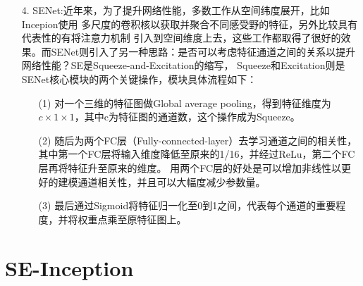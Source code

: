 \begin{itemize}

\item [4.]SENet:近年来，为了提升网络性能，多数工作从空间纬度展开，比如Incepion使用
多尺度的卷积核以获取并聚合不同感受野的特征，另外比较具有代表性的有将注意力机制
引入到空间维度上去，这些工作都取得了很好的效果。而SENet则引入了另一种思路：是否可以考虑特征通道之间的关系以提升网络性能？SE是Squeeze-and-Excitation的缩写，
Squeeze和Excitation则是SENet核心模块的两个关键操作，模块具体流程如下：
\begin{itemize}
  \item [(1)] 对一个三维的特征图做Global average pooling，得到特征维度为${c\times1\times1}$，其中c为特征图的通道数，这个操作成为Squeeze。
  \item [(2)] 随后为两个FC层（Fully-connected-layer）去学习通道之间的相关性，其中第一个FC层将输入维度降低至原来的1/16，并经过ReLu，第二个FC层再将特征升至原来的维度。
  用两个FC层的好处是可以增加非线性以更好的建模通道相关性，并且可以大幅度减少参数量。
  \item [(3)] 最后通过Sigmoid将特征归一化至0到1之间，代表每个通道的重要程度，并将权重点乘至原特征图上。
\end{itemize}
\end{itemize}


\section{SE-Inception}
